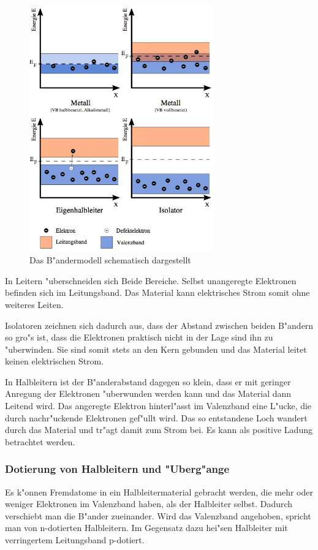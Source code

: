 			\begin{figure}[h!]
				\centering
				\includegraphics[width = 8cm]{img/baender.JPG}
				\caption{Das B"andermodell schematisch dargestellt \cite{wiki}}
				\label{fig:baendermodell}
			\end{figure}

			In Leitern "uberschneiden sich Beide Bereiche.
			Selbst unangeregte Elektronen befinden sich im Leitungsband.
			Das Material kann elektrisches Strom somit ohne weiteres Leiten.

			Isolatoren zeichnen sich dadurch aus, dass der Abstand zwischen beiden B"andern so gro"s ist, dass die Elektronen praktisch nicht in der Lage sind ihn zu "uberwinden.
			Sie sind somit stets an den Kern gebunden und das Material leitet keinen elektrischen Strom.

			In Halbleitern ist der B"anderabstand dagegen so klein, dass er mit geringer Anregung der Elektronen "uberwunden werden kann und das Material dann Leitend wird.
			Das angeregte Elektron hinterl"asst im Valenzband eine L"ucke, die durch nachr"uckende Elektronen gef"ullt wird.
			Das so entstandene Loch wandert durch das Material und tr"agt damit zum Strom bei.
			Es kann als positive Ladung betrachtet werden.

		\subsubsection{Dotierung von Halbleitern und "Uberg"ange}
			\label{subsub:dotierung}
			Es k"onnen Fremdatome in ein Halbleitermaterial gebracht werden, die mehr oder weniger Elektronen im Valenzband haben, als der Halbleiter selbst.
			Dadurch verschiebt man die B"ander zueinander.
			Wird das Valenzband angehoben, spricht man von n-dotierten Halbleitern.
			Im Gegensatz dazu hei"sen Halbleiter mit verringertem Leitungsband p-dotiert.


